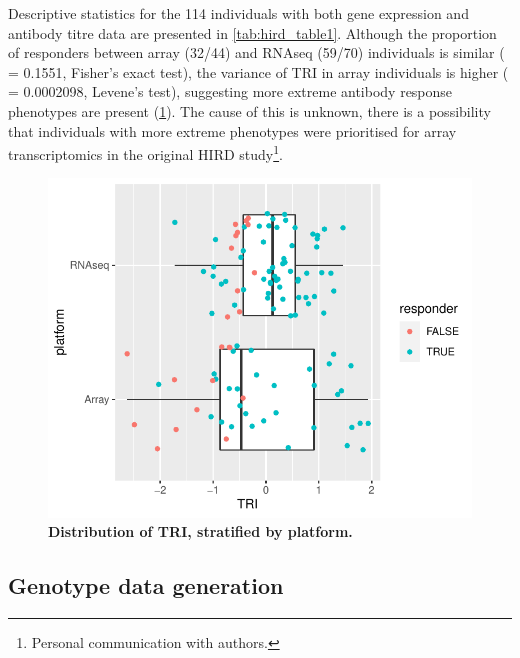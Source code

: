 Descriptive statistics for the 114 individuals with both gene expression and antibody titre data are presented in \cref{tab:hird_table1}.
Although the proportion of responders between array (32/44) and \gls{RNAseq} (59/70) individuals is similar (\pvalue{} = \num{0.1551}, Fisher's exact test), the variance of \gls{TRI} in array individuals is higher (\pvalue{} = \num{0.0002098}, Levene's test), suggesting more extreme antibody response phenotypes are present (\cref{fig:hird_phenotypes_by_platform}).
The cause of this is unknown, there is a possibility that individuals with more extreme phenotypes were prioritised for array transcriptomics in the original \gls{HIRD} study\footnote{Personal communication with \textcite{sobolev2016AdjuvantedInfluenzaH1N1Vaccination} authors.}.



\begin{figure}
    \includegraphics[width=1.0\textwidth,page=1]{mainmatter/figures/chapter_02/compare_phenotype_by_platform.pheno_boxplots.pdf}
    \caption{\textbf{Distribution of \gls{TRI}, stratified by platform.}}
    \label{fig:hird_phenotypes_by_platform}
\end{figure}

\subsection{Genotype data generation}

